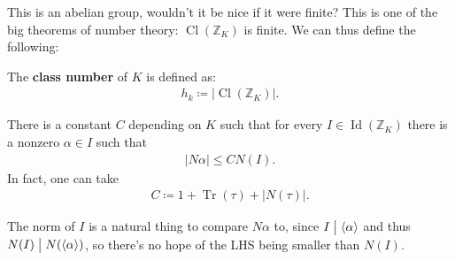 \begin{remark}

This is an abelian group, wouldn't it be nice if it were finite? This is
one of the big theorems of number theory:
\({ \operatorname{Cl}} ({\mathbb{Z}}_K)\) is finite. We can thus define
the following:

\end{remark}

\begin{definition}

The \textbf{class number} of \(K\) is defined as:
\begin{align*}
h_k \coloneqq{\left\lvert { { \operatorname{Cl}} ({\mathbb{Z}}_K) } \right\rvert}
.\end{align*}

\end{definition}

\begin{lemma}

There is a constant \(C\) depending on \(K\) such that for every
\(I \in \operatorname{Id}({\mathbb{Z}}_K)\) there is a nonzero
\(\alpha\in I\) such that
\begin{align*}
{\left\lvert {N \alpha} \right\rvert}\leq C N(I) 
.\end{align*}
In fact, one can take
\begin{align*}
C \coloneqq 1 + \operatorname{Tr}(\tau) + {\left\lvert {N(\tau)} \right\rvert} 
.\end{align*}

\end{lemma}

\begin{remark}

The norm of \(I\) is a natural thing to compare \(N \alpha\) to, since
\(I \bigm|\left\langle{ \alpha }\right\rangle\) and thus
\(N(I) \bigm|N(\left\langle{ \alpha }\right\rangle)\), so there's no
hope of the LHS being smaller than \(N(I)\).

\end{remark}

